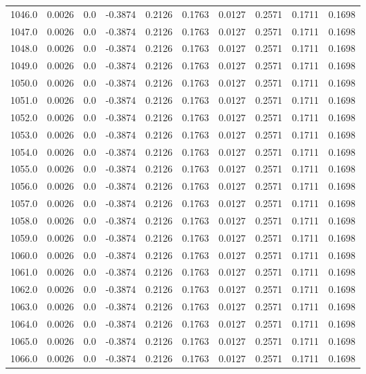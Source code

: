 \begin{longtable}{lrrrrrrrrr}
1046.0 & 0.0026 & 0.0 & -0.3874 & 0.2126 & 0.1763 & 0.0127 & 0.2571 & 0.1711 & 0.1698 \\
1047.0 & 0.0026 & 0.0 & -0.3874 & 0.2126 & 0.1763 & 0.0127 & 0.2571 & 0.1711 & 0.1698 \\
1048.0 & 0.0026 & 0.0 & -0.3874 & 0.2126 & 0.1763 & 0.0127 & 0.2571 & 0.1711 & 0.1698 \\
1049.0 & 0.0026 & 0.0 & -0.3874 & 0.2126 & 0.1763 & 0.0127 & 0.2571 & 0.1711 & 0.1698 \\
1050.0 & 0.0026 & 0.0 & -0.3874 & 0.2126 & 0.1763 & 0.0127 & 0.2571 & 0.1711 & 0.1698 \\
1051.0 & 0.0026 & 0.0 & -0.3874 & 0.2126 & 0.1763 & 0.0127 & 0.2571 & 0.1711 & 0.1698 \\
1052.0 & 0.0026 & 0.0 & -0.3874 & 0.2126 & 0.1763 & 0.0127 & 0.2571 & 0.1711 & 0.1698 \\
1053.0 & 0.0026 & 0.0 & -0.3874 & 0.2126 & 0.1763 & 0.0127 & 0.2571 & 0.1711 & 0.1698 \\
1054.0 & 0.0026 & 0.0 & -0.3874 & 0.2126 & 0.1763 & 0.0127 & 0.2571 & 0.1711 & 0.1698 \\
1055.0 & 0.0026 & 0.0 & -0.3874 & 0.2126 & 0.1763 & 0.0127 & 0.2571 & 0.1711 & 0.1698 \\
1056.0 & 0.0026 & 0.0 & -0.3874 & 0.2126 & 0.1763 & 0.0127 & 0.2571 & 0.1711 & 0.1698 \\
1057.0 & 0.0026 & 0.0 & -0.3874 & 0.2126 & 0.1763 & 0.0127 & 0.2571 & 0.1711 & 0.1698 \\
1058.0 & 0.0026 & 0.0 & -0.3874 & 0.2126 & 0.1763 & 0.0127 & 0.2571 & 0.1711 & 0.1698 \\
1059.0 & 0.0026 & 0.0 & -0.3874 & 0.2126 & 0.1763 & 0.0127 & 0.2571 & 0.1711 & 0.1698 \\
1060.0 & 0.0026 & 0.0 & -0.3874 & 0.2126 & 0.1763 & 0.0127 & 0.2571 & 0.1711 & 0.1698 \\
1061.0 & 0.0026 & 0.0 & -0.3874 & 0.2126 & 0.1763 & 0.0127 & 0.2571 & 0.1711 & 0.1698 \\
1062.0 & 0.0026 & 0.0 & -0.3874 & 0.2126 & 0.1763 & 0.0127 & 0.2571 & 0.1711 & 0.1698 \\
1063.0 & 0.0026 & 0.0 & -0.3874 & 0.2126 & 0.1763 & 0.0127 & 0.2571 & 0.1711 & 0.1698 \\
1064.0 & 0.0026 & 0.0 & -0.3874 & 0.2126 & 0.1763 & 0.0127 & 0.2571 & 0.1711 & 0.1698 \\
1065.0 & 0.0026 & 0.0 & -0.3874 & 0.2126 & 0.1763 & 0.0127 & 0.2571 & 0.1711 & 0.1698 \\
1066.0 & 0.0026 & 0.0 & -0.3874 & 0.2126 & 0.1763 & 0.0127 & 0.2571 & 0.1711 & 0.1698 \\

\end{longtable}
